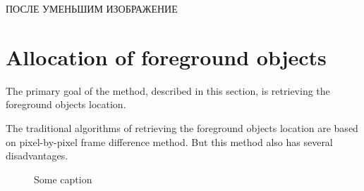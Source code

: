 \documentclass[12pt,a4paper,oneside,titlepage]{article}
\begin{document}

ПОСЛЕ УМЕНЬШИМ ИЗОБРАЖЕНИЕ





























\newpage
\section*{Allocation of foreground objects}
The primary goal of the method, described in this section, is retrieving the foreground objects location.

The traditional algorithms of retrieving the foreground objects location are based on pixel-by-pixel frame difference method.
But this method also has several disadvantages.

\begin{figure}[h]
  \caption{Some caption}
  \label{fig:fig1}
\end{figure}
\end{document}
